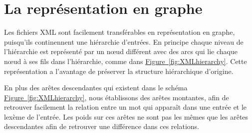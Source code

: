 \section{La représentation en graphe}

Les fichiers XML sont facilement transférables en représentation en graphe, 
puisqu'ils continennent une hiérarchie d'entrées. En principe chaque niveau de 
l'hiérarchie est représenté par un nœud différent avec des arcs qui lie chaque 
nœud à ses fils dans l'hiérarchie, comme dans 
\hyperref[fig:XMLhierarchy]{Figure~\ref*{fig:XMLhierarchy}}. Cette 
représentation a l'avantage de préserver la structure hiérarchique d'origine.

En plus des arêtes descendantes qui existent dans le schéma 
\hyperref[fig:XMLhierarchy]{Figure~\ref*{fig:XMLhierarchy}}, nous établissons 
des arêtes montantes, afin de retrouver facilement la relation entre un mot qui 
apparaît dans une entrée et le lexème de l'entrée. Les poids sur ces arêtes ne 
sont pas les mêmes que les arêtes descendantes afin de retrouver une différence 
dans ces relations.
